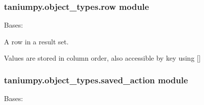 \documentclass[letterpaper,10pt,english]{sphinxmanual}
\begin{document}
\subsubsection{taniumpy.object\_types.row module}
\label{taniumpy.object_types:taniumpy-object-types-row-module}\label{taniumpy.object_types:module-taniumpy.object_types.row}

\begin{fulllineitems}
\label{taniumpy.object_types:taniumpy.object_types.row.Row}
Bases: \href{http://docs.python.org/2.7/library/functions.html\#object}{}

A row in a result set.

Values are stored in column order, also accessible
by key using {[}{]}

\begin{fulllineitems}
\label{taniumpy.object_types:taniumpy.object_types.row.Row.fromSOAPElement}
\end{fulllineitems}


\end{fulllineitems}



\subsubsection{taniumpy.object\_types.saved\_action module}
\label{taniumpy.object_types:taniumpy-object-types-saved-action-module}\label{taniumpy.object_types:module-taniumpy.object_types.saved_action}

\begin{fulllineitems}
\label{taniumpy.object_types:taniumpy.object_types.saved_action.SavedAction}
Bases: {\hyperref[taniumpy.object_types:taniumpy.object_types.base.BaseType]{}}

\end{fulllineitems}
\end{document}
